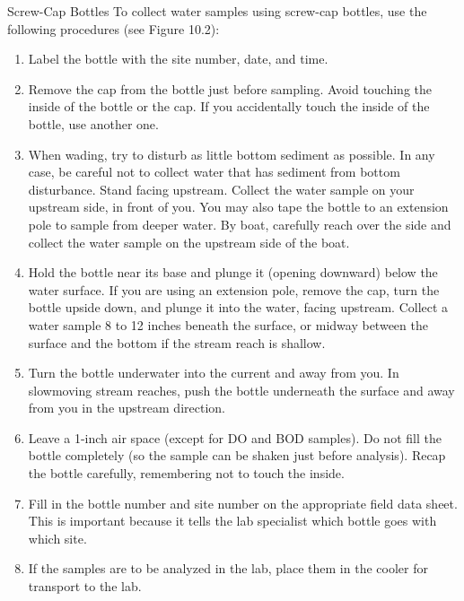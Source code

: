 \documentclass{article}
\begin{document}
Screw-Cap Bottles To collect water samples using screw-cap bottles, use
the following procedures (see Figure 10.2):

\begin{enumerate}
\item
  Label the bottle with the site number, date, and time.
\item
  Remove the cap from the bottle just before sampling. Avoid touching
  the inside of the bottle or the cap. If you accidentally touch the
  inside of the bottle, use another one.
\item
  When wading, try to disturb as little bottom sediment as possible. In
  any case, be careful not to collect water that has sediment from
  bottom disturbance. Stand facing upstream. Collect the water sample on
  your upstream side, in front of you. You may also tape the bottle to
  an extension pole to sample from deeper water. By boat, carefully
  reach over the side and collect the water sample on the upstream side
  of the boat.
\item
  Hold the bottle near its base and plunge it (opening downward) below
  the water surface. If you are using an extension pole, remove the cap,
  turn the bottle upside down, and plunge it into the water, facing
  upstream. Collect a water sample 8 to 12 inches beneath the surface,
  or midway between the surface and the bottom if the stream reach is
  shallow.
\item
  Turn the bottle underwater into the current and away from you. In
  slowmoving stream reaches, push the bottle underneath the surface and
  away from you in the upstream direction.
\item
  Leave a 1-inch air space (except for DO and BOD samples). Do not fill
  the bottle completely (so the sample can be shaken just before
  analysis). Recap the bottle carefully, remembering not to touch the
  inside.
\item
  Fill in the bottle number and site number on the appropriate field
  data sheet. This is important because it tells the lab specialist
  which bottle goes with which site.
\item
  If the samples are to be analyzed in the lab, place them in the cooler
  for transport to the lab.
\end{enumerate}
\end{document}
